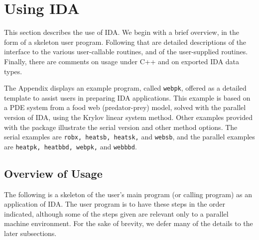 \section{Using IDA}

This section describes the use of IDA.  We begin with a brief
overview, in the form of a skeleton user program.  Following that are
detailed descriptions of the interface to the various user-callable
routines, and of the user-supplied routines.  Finally, there are
comments on usage under C++ and on exported IDA data types.

The Appendix displays an example program, called {\tt webpk}, offered
as a detailed template to assist users in preparing IDA applications.
This example is based on a PDE system from a food web (predator-prey)
model, solved with the parallel version of IDA, using the Krylov
linear system method.  Other examples provided with the package
illustrate the serial version and other method options.  The serial
examples are {\tt robx, heatsb, heatsk,} and {\tt websb}, and the
parallel examples are {\tt heatpk, heatbbd, webpk,} and {\tt webbbd}.


\subsection{Overview of Usage}

The following is a skeleton of the user's main program (or
calling program) as an application of IDA.  The user program is to
have these steps in the order indicated, although some of the steps
given are relevant only to a parallel machine environment.  For the
sake of brevity, we defer many of the details to the later
subsections.

\newpage

